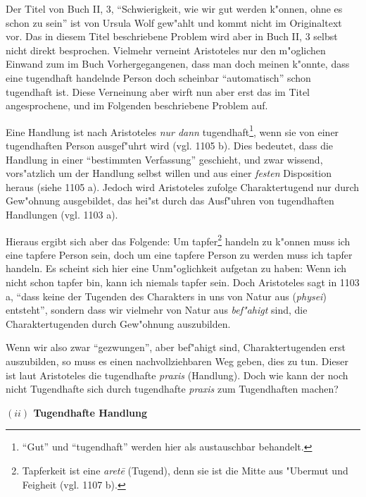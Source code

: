 \documentclass[a4paper, emulatestandardclasses, 12pt]{scrartcl}
\begin{document}
\begin{onehalfspace}
\noindent Der Titel von Buch II, 3, "`Schwierigkeit, wie wir gut werden k"onnen, ohne es schon zu sein"' ist von Ursula Wolf gew"ahlt und kommt nicht im Originaltext vor. Das in diesem Titel beschriebene Problem wird aber in Buch II, 3 selbst nicht direkt besprochen. Vielmehr verneint Aristoteles nur den m"oglichen Einwand zum im Buch Vorhergegangenen, dass man doch meinen k"onnte, dass eine tugendhaft handelnde Person doch scheinbar "`automatisch"' schon tugendhaft ist. Diese Verneinung aber wirft nun aber erst das im Titel angesprochene, und im Folgenden beschriebene Problem auf.

Eine Handlung ist nach Aristoteles \emph{nur dann} tugendhaft\footnote{"`Gut"' und "`tugendhaft"' werden hier als austauschbar behandelt.}, wenn sie von einer tugendhaften Person ausgef"uhrt wird (vgl. 1105 b). Dies bedeutet, dass die Handlung in einer "`bestimmten Verfassung"' geschieht, und zwar wissend, vors"atzlich um der Handlung selbst willen und aus einer \emph{festen} Disposition heraus (siehe 1105 a). Jedoch wird Aristoteles zufolge Charaktertugend nur durch Gew"ohnung ausgebildet, das hei"st durch das Ausf"uhren von tugendhaften Handlungen (vgl. 1103 a). 

Hieraus ergibt sich aber das Folgende: Um tapfer\footnote{Tapferkeit ist eine \emph{aret\={e}} (Tugend), denn sie ist die Mitte aus "Ubermut und Feigheit (vgl. 1107 b).} handeln zu k"onnen muss ich eine tapfere Person sein, doch um eine tapfere Person zu werden muss ich tapfer handeln. Es scheint sich hier eine Unm"oglichkeit aufgetan zu haben: Wenn ich nicht schon tapfer bin, kann ich niemals tapfer sein. Doch Aristoteles sagt in 1103 a, "`dass keine der Tugenden des Charakters in uns von Natur aus (\emph{physei}) entsteht"', sondern dass wir vielmehr von Natur aus \emph{bef"ahigt} sind, die Charaktertugenden durch Gew"ohnung auszubilden. 

Wenn wir also zwar "`gezwungen"', aber bef"ahigt sind, Charaktertugenden erst auszubilden, so muss es einen nachvollziehbaren Weg geben, dies zu tun. Dieser ist laut Aristoteles die tugendhafte \emph{praxis} (Handlung). Doch wie kann der noch nicht Tugendhafte sich durch tugendhafte \emph{praxis} zum Tugendhaften machen?

\vspace{5mm}
\noindent\textbf{$(ii)$ Tugendhafte Handlung}	


\end{onehalfspace}
\end{document}
